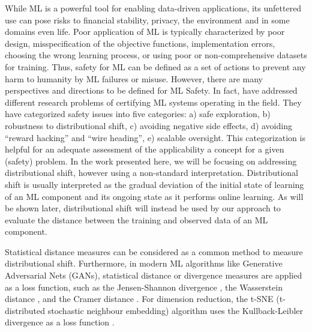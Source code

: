 \documentclass{article}
\begin{document}
While ML is a powerful tool for enabling data-driven applications, its unfettered use can pose risks to financial stability, privacy, the environment and in some domains even life. Poor application of ML is typically characterized by poor design, misspecification of the objective functions, implementation errors, choosing the wrong learning process, or using poor or non-comprehensive datasets for training. Thus, safety for ML can be defined as a set of actions to prevent any harm to humanity by ML failures or misuse. However, there are many perspectives and directions to be defined for ML Safety. In fact, \cite{amodei2016concrete} have addressed different research problems of certifying ML systems operating in the field. They have categorized safety issues into five categories: a) safe exploration, b) robustness to distributional shift, c) avoiding negative side effects, d) avoiding “reward hacking” and “wire heading”, e) scalable oversight. This categorization is helpful for an adequate assessment of the applicability a concept for a given (safety) problem. In the work presented here, we will be focusing on addressing distributional shift, however using a non-standard interpretation. Distributional shift is usually interpreted as the gradual deviation of the initial state of learning of an ML component and its ongoing state as it performs online learning. As will be shown later, distributional shift will instead be used by our approach to evaluate the distance between the training and observed data of an ML component.

Statistical distance measures can be considered as a common method to measure distributional shift. Furthermore, in modern ML algorithms like Generative Adversarial Nets (GANs), statistical distance or divergence measures are applied as a loss function, such as the Jensen-Shannon divergence \cite{goodfellow2014generative}, the Wasserstein distance \cite{gulrajani2017improved}, and the Cramer distance \cite{bellemare2017cramer}. For dimension reduction, the t-SNE (t-distributed stochastic neighbour embedding) algorithm uses the Kullback-Leibler divergence as a loss function \cite{van2014accelerating}.
\end{document}
